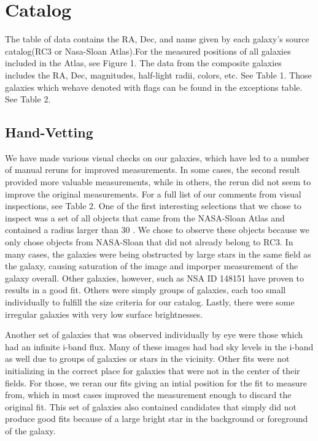 \documentclass[12pt,preprint,pdftex]{aastex}
\newcommand{\units}[1]{\mathrm{#1}}
\renewcommand{\arcsec}{\units{arcsec}}
\begin{document}

\section{Catalog}
The table of data contains the RA, Dec, and name given by each galaxy's source catalog(RC3 or Nasa-Sloan Atlas).For the measured positions of all galaxies included in the Atlas, see Figure 1. The data from the composite galaxies includes the RA, Dec, magnitudes, half-light radii, colors, etc. See Table 1. Those galaxies which wehave denoted with flags can be found in the exceptions table. See Table 2. 


\subsection{Hand-Vetting}
We have made various visual checks on our galaxies, which have led to a number of manual reruns for improved measurements. In some cases, the second result provided more valuable measurements, while in others, the rerun did not seem to improve the original measurements. For a full list of our comments from visual inspections, see Table 2. One of the first interesting selections that we chose to inspect was a set of all objects that came from the NASA-Sloan Atlas and contained a radius larger than 30 \arcsec. We chose to observe these objects because we only chose objects from NASA-Sloan that did not already belong to RC3. In many cases, the galaxies were being obstructed by large stars in the same field as the galaxy, causing saturation of the image and imporper measurement of the galaxy overall. Other galaxies, however, such as NSA ID 148151 have proven to results in a good fit. Others were simply groups of galaxies, each too small individually to fulfill the size criteria for our catalog. Lastly, there were some irregular galaxies with very low surface brightnesses.

Another set of galaxies that was observed individually by eye were those which had an infinite i-band flux. Many of these images had bad sky levels in the i-band as well due to groups of galaxies or stars in the vicinity. Other fits were not initializing in the correct place for galaxies that were not in the center of their fields. For those, we reran our fits giving an intial position for the fit to measure from, which in most cases improved the measurement enough to discard the original fit. This set of galaxies also contained candidates that simply did not produce good fits because of a large bright star in the background or foreground of the galaxy.
\end{document}
